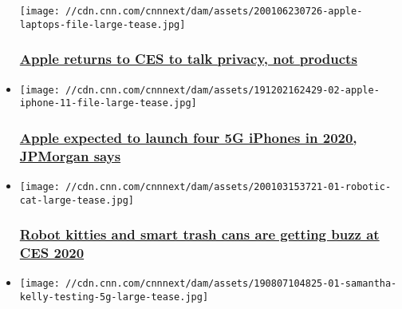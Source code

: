 \begin{itemize}
  \texttt{[image: //cdn.cnn.com/cnnnext/dam/assets/200106230726-apple-laptops-file-large-tease.jpg]}

  \hypertarget{apple-returns-to-ces-to-talk-privacy-not-products}{%
  \subsubsection{\texorpdfstring{\href{/2020/01/07/tech/apple-privacy-ces/index.html}{Apple
  returns to CES to talk privacy, not
  products}}{Apple returns to CES to talk privacy, not products}}\label{apple-returns-to-ces-to-talk-privacy-not-products}}
\item
  \href{/2019/12/02/tech/apple-5g-iphones-2020/index.html}{}

  \texttt{[image: //cdn.cnn.com/cnnnext/dam/assets/191202162429-02-apple-iphone-11-file-large-tease.jpg]}

  \hypertarget{apple-expected-to-launch-four-5g-iphones-in-2020-jpmorgan-says}{%
  \subsubsection{\texorpdfstring{\href{/2019/12/02/tech/apple-5g-iphones-2020/index.html}{Apple
  expected to launch four 5G iPhones in 2020, JPMorgan
  says}}{Apple expected to launch four 5G iPhones in 2020, JPMorgan says}}\label{apple-expected-to-launch-four-5g-iphones-in-2020-jpmorgan-says}}
\item
  \href{/2020/01/06/tech/ces-2020-trends/index.html}{}

  \texttt{[image: //cdn.cnn.com/cnnnext/dam/assets/200103153721-01-robotic-cat-large-tease.jpg]}

  \hypertarget{robot-kitties-and-smart-trash-cans-are-getting-buzz-at-ces-2020}{%
  \subsubsection{\texorpdfstring{\href{/2020/01/06/tech/ces-2020-trends/index.html}{Robot
  kitties and smart trash cans are getting buzz at CES
  2020}}{Robot kitties and smart trash cans are getting buzz at CES 2020}}\label{robot-kitties-and-smart-trash-cans-are-getting-buzz-at-ces-2020}}
\item
  \href{/2019/08/09/tech/5g-review/index.html}{}

  \texttt{[image: //cdn.cnn.com/cnnnext/dam/assets/190807104825-01-samantha-kelly-testing-5g-large-tease.jpg]}

  \hypertarget{i-tried-5g-it-will-change-your-life--if-you-can-find-it}{%
}
\end{itemize}
